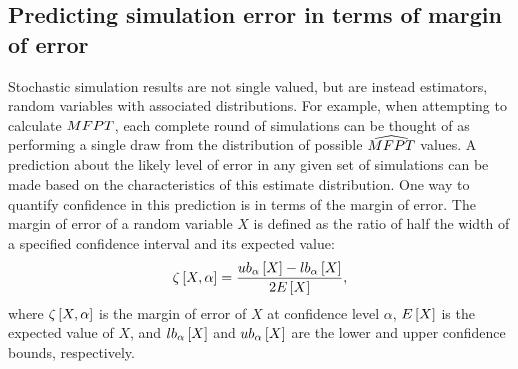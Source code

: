 
\subsection{Predicting simulation error in terms of margin of error}
%

Stochastic simulation results are not single valued, but are instead estimators, random variables with associated distributions. For example, when attempting to calculate $MFPT$, each complete round of simulations can be thought of as performing a single draw from the distribution of possible $\widehat{MFPT}$ values. A prediction about the likely level of error in any given set of simulations can be made based on the characteristics of this estimate distribution. One way to quantify confidence in this prediction is in terms of the margin of error. The margin of error of a random variable $X$ is defined as the ratio of half the width of a specified confidence interval and its expected value:
    \begin{equation}
    \label{eq:moe_definition}
        \zeta \left[ X, \alpha \right] = \frac{ub_{\alpha} \left[ X \right] - lb_{\alpha} \left[ X \right]}{2 E \left[ X \right]},
    \end{equation}
where $\zeta \left[ X, \alpha \right]$ is the margin of error of $X$ at confidence level $\alpha$, $E \left[ X \right]$ is the expected value of $X$, and $lb_{\alpha} \left[ X \right]$ and $ub_{\alpha} \left[ X \right]$ are the lower and upper confidence bounds, respectively. 

